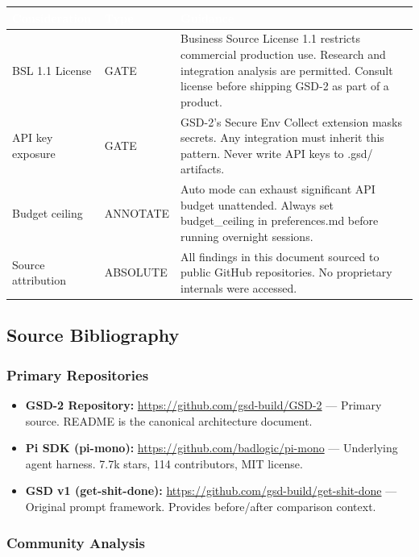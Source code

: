 \documentclass[11pt,letterpaper]{article}
\newcommand{\tableheader}[1]{\textbf{\sffamily\textcolor{white}{#1}}}
\begin{document}
\begin{center}
\begin{tabularx}{\textwidth}{L{4cm}L{2.5cm}X}
\toprule
{}
\tableheader{Consideration} & \tableheader{Type} & \tableheader{Guidance} \\
\midrule
BSL 1.1 License & GATE & Business Source License 1.1 restricts commercial production use. Research and integration analysis are permitted. Consult license before shipping GSD-2 as part of a product. \\
API key exposure & GATE & GSD-2's Secure Env Collect extension masks secrets. Any integration must inherit this pattern. Never write API keys to .gsd/ artifacts. \\
Budget ceiling & ANNOTATE & Auto mode can exhaust significant API budget unattended. Always set budget\_ceiling in preferences.md before running overnight sessions. \\
Source attribution & ABSOLUTE & All findings in this document sourced to public GitHub repositories. No proprietary internals were accessed. \\
\bottomrule
\end{tabularx}
\end{center}

\subsection{Source Bibliography}

\subsubsection{Primary Repositories}

\begin{itemize}
  \item \textbf{GSD-2 Repository:} \url{https://github.com/gsd-build/GSD-2} --- Primary source. README is the canonical architecture document.
  \item \textbf{Pi SDK (pi-mono):} \url{https://github.com/badlogic/pi-mono} --- Underlying agent harness. 7.7k stars, 114 contributors, MIT license.
  \item \textbf{GSD v1 (get-shit-done):} \url{https://github.com/gsd-build/get-shit-done} --- Original prompt framework. Provides before/after comparison context.
\end{itemize}

\subsubsection{Community Analysis}
\end{document}
